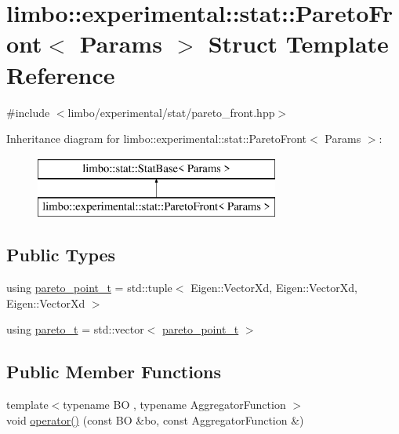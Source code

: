 \hypertarget{structlimbo_1_1experimental_1_1stat_1_1_pareto_front}{}\section{limbo\+:\+:experimental\+:\+:stat\+:\+:Pareto\+Front$<$ Params $>$ Struct Template Reference}
\label{structlimbo_1_1experimental_1_1stat_1_1_pareto_front}


{\ttfamily \#include $<$limbo/experimental/stat/pareto\+\_\+front.\+hpp$>$}

Inheritance diagram for limbo\+:\+:experimental\+:\+:stat\+:\+:Pareto\+Front$<$ Params $>$\+:\begin{figure}[H]
\begin{center}
\leavevmode
\includegraphics[height=2.000000cm]{structlimbo_1_1experimental_1_1stat_1_1_pareto_front}
\end{center}
\end{figure}
\subsection*{Public Types}
\begin{DoxyCompactItemize}
\item 
using \hyperlink{structlimbo_1_1experimental_1_1stat_1_1_pareto_front_a2d872d2ad0a93b4c459bad640be158b9}{pareto\+\_\+point\+\_\+t} = std\+::tuple$<$ Eigen\+::\+Vector\+Xd, Eigen\+::\+Vector\+Xd, Eigen\+::\+Vector\+Xd $>$
\item 
using \hyperlink{structlimbo_1_1experimental_1_1stat_1_1_pareto_front_a710260d53bff65b4841c348b074a6e23}{pareto\+\_\+t} = std\+::vector$<$ \hyperlink{structlimbo_1_1experimental_1_1stat_1_1_pareto_front_a2d872d2ad0a93b4c459bad640be158b9}{pareto\+\_\+point\+\_\+t} $>$
\end{DoxyCompactItemize}
\subsection*{Public Member Functions}
\begin{DoxyCompactItemize}
\item 
{\footnotesize template$<$typename B\+O , typename Aggregator\+Function $>$ }\\void \hyperlink{structlimbo_1_1experimental_1_1stat_1_1_pareto_front_a341b34d96290a874818bbdb4f27f9f2b}{operator()} (const B\+O \&bo, const Aggregator\+Function \&)
\end{DoxyCompactItemize}


